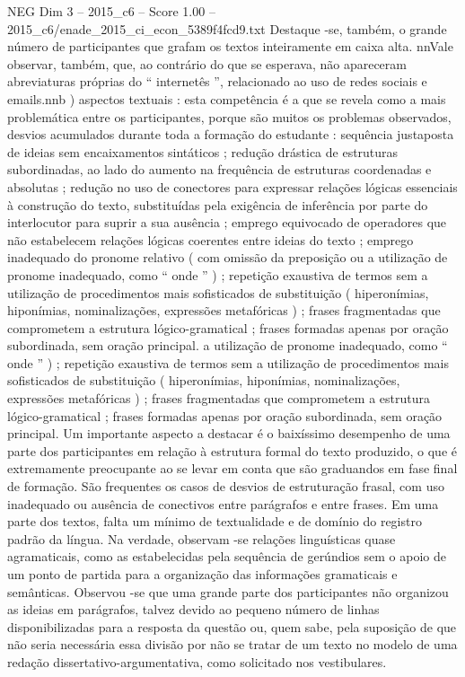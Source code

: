 \begin{textsample}{NEG Dim 3 – 2015\_c6 – Score 1.00 – 2015\_c6/enade\_2015\_ci\_econ\_5389f4fcd9.txt}
Destaque -se, também, o grande número de participantes que grafam os textos inteiramente em caixa alta. nnVale observar, também, que, ao contrário do que se esperava, não apareceram abreviaturas próprias do “ internetês ”, relacionado ao uso de redes sociais e emails.nnb ) aspectos textuais : esta competência é a que se revela como a mais problemática entre os participantes, porque são muitos os problemas observados, desvios acumulados durante toda a formação do estudante : sequência justaposta de ideias sem encaixamentos sintáticos ; redução drástica de estruturas subordinadas, ao lado do aumento na frequência de estruturas coordenadas e absolutas ; redução no uso de conectores para expressar relações lógicas essenciais à construção do texto, substituídas pela exigência de inferência por parte do interlocutor para suprir a sua ausência ; emprego equivocado de operadores que não estabelecem relações lógicas coerentes entre ideias do texto ; emprego inadequado do pronome relativo ( com omissão da preposição ou a utilização de pronome inadequado, como “ onde ” ) ; repetição exaustiva de termos sem a utilização de procedimentos mais sofisticados de substituição ( hiperonímias, hiponímias, nominalizações, expressões metafóricas ) ; frases fragmentadas que comprometem a estrutura lógico-gramatical ; frases formadas apenas por oração subordinada, sem oração principal. a utilização de pronome inadequado, como “ onde ” ) ; repetição exaustiva de termos sem a utilização de procedimentos mais sofisticados de substituição ( hiperonímias, hiponímias, nominalizações, expressões metafóricas ) ; frases fragmentadas que comprometem a estrutura lógico-gramatical ; frases formadas apenas por oração subordinada, sem oração principal.
Um importante aspecto a destacar é o baixíssimo desempenho de uma parte dos participantes em relação à estrutura formal do texto produzido, o que é extremamente preocupante ao se levar em conta que são graduandos em fase final de formação.
São frequentes os casos de desvios de estruturação frasal, com uso inadequado ou ausência de conectivos entre parágrafos e entre frases.
Em uma parte dos textos, falta um mínimo de textualidade e de domínio do registro padrão da língua.
Na verdade, observam -se relações linguísticas quase agramaticais, como as estabelecidas pela sequência de gerúndios sem o apoio de um ponto de partida para a organização das informações gramaticais e semânticas.
Observou -se que uma grande parte dos participantes não organizou as ideias em parágrafos, talvez devido ao pequeno número de linhas disponibilizadas para a resposta da questão ou, quem sabe, pela suposição de que não seria necessária essa divisão por não se tratar de um texto no modelo de uma redação dissertativo-argumentativa, como solicitado nos vestibulares.

\end{textsample}
